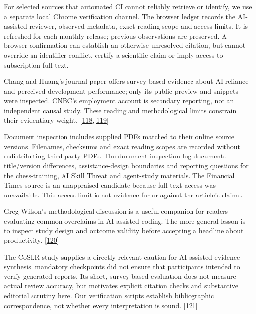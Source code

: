 For selected sources that automated CI cannot reliably retrieve or identify, we use a separate \href{https://does-ai-help.github.io/downloads/does-ai-help-browser-verification-guide-2026.10.15.md}{local Chrome verification channel}. The \href{https://does-ai-help.github.io/downloads/does-ai-help-browser-verification-2026.10.15.json}{browser ledger} records the AI-assisted reviewer, observed metadata, exact reading scope and access limits. It is refreshed for each monthly release; previous observations are preserved. A browser confirmation can establish an otherwise unresolved citation, but cannot override an identifier conflict, certify a scientific claim or imply access to subscription full text.


Chang and Huang's journal paper offers survey-based evidence about AI reliance and perceived development performance; only its public preview and snippets were inspected. CNBC's employment account is secondary reporting, not an independent causal study. These reading and methodological limits constrain their evidentiary weight. [\hyperlink{ref-candidate-sciencedirect-2026}{118}, \hyperlink{ref-candidate-cnbc-2026}{119}]


Document inspection includes supplied PDFs matched to their online source versions. Filenames, checksums and exact reading scopes are recorded without redistributing third-party PDFs. The \href{https://does-ai-help.github.io/downloads/does-ai-help-document-followup-2026.10.15.md}{document inspection log} documents title/version differences, assistance-design boundaries and reporting questions for the chess-training, AI Skill Threat and agent-study materials. The Financial Times source is an unappraised candidate because full-text access was unavailable. This access limit is not evidence for or against the article's claims.


Greg Wilson's methodological discussion is a useful companion for readers evaluating common overclaims in AI-assisted coding. The more general lesson is to inspect study design and outcome validity before accepting a headline about productivity. [\hyperlink{ref-wilson2026}{120}]


The CoSLR study supplies a directly relevant caution for AI-assisted evidence synthesis: mandatory checkpoints did not ensure that participants intended to verify generated reports. Its short, survey-based evaluation does not measure actual review accuracy, but motivates explicit citation checks and substantive editorial scrutiny here. Our verification scripts establish bibliographic correspondence, not whether every interpretation is sound. [\hyperlink{ref-coslr2026}{121}]



